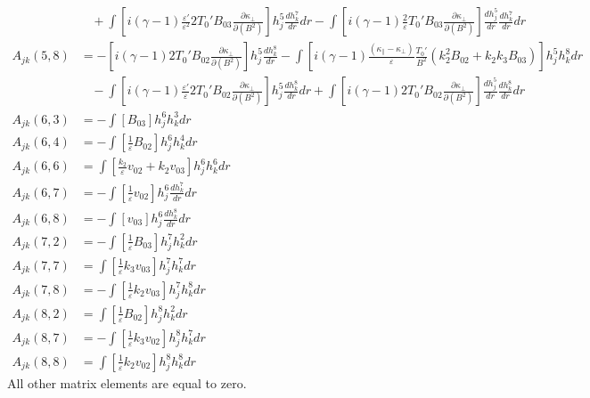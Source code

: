 \documentclass[11pt, fleqn]{article}
\newcommand{\eps}{\varepsilon}
\begin{document}
\begin{align*}
				 &~~~~ + \int \left[i(\gamma - 1)\frac{\eps'}{\eps^2}2T_0'B_{03}\frac{\partial \kappa_\bot}{\partial(B^2)}\right] h_j^5 \frac{dh_k^7}{dr}dr
				 								 - \int \left[i(\gamma - 1)\frac{2}{\eps}T_0'B_{03}\frac{\partial \kappa_\bot}{\partial(B^2)}\right] \frac{dh_j^5}{dr}\frac{dh_k^7}{dr} dr																\\
	A_{jk}(5, 8) &= -\left[i(\gamma - 1)2T_0'B_{02}\frac{\partial \kappa_\bot}{\partial(B^2)}\right] h_j^5 \frac{dh_k^8}{dr} 
												 - \int \left[i(\gamma - 1)\frac{(\kappa_\parallel - \kappa_\bot)}{\eps}\frac{T_0'}{B^2}(k_2^2B_{02} + k_2k_3B_{03})\right] h_j^5 h_k^8 dr	 															\\
				 &~~~~ - \int \left[i(\gamma - 1)\frac{\eps'}{\eps}2T_0'B_{02}\frac{\partial \kappa_\bot}{\partial(B^2)}\right] h_j^5 \frac{dh_k^8}{dr} dr																								
				 								 + \int \left[i(\gamma - 1)2T_0'B_{02}\frac{\partial \kappa_\bot}{\partial(B^2)}\right] \frac{dh_j^5}{dr} \frac{dh_k^8}{dr} dr																			\\
	A_{jk}(6, 3) &= -\int \left[B_{03}\right] h_j^6 h_k^3 dr								\\
	A_{jk}(6, 4) &= -\int \left[\frac{1}{\eps}B_{02}\right] h_j^6 h_k^4 dr					\\
	A_{jk}(6, 6) &=  \int \left[\frac{k_2}{\eps}v_{02} + k_2v_{03}\right] h_j^6 h_k^6 dr	\\
	A_{jk}(6, 7) &= -\int \left[\frac{1}{\eps}v_{02}\right] h_j^6 \frac{dh_k^7}{dr} dr		\\
	A_{jk}(6, 8) &= -\int \left[v_{03}\right] h_j^6 \frac{dh_k^8}{dr} dr					\\
	A_{jk}(7, 2) &= -\int \left[\frac{1}{\eps}B_{03}\right] h_j^7 h_k^2 dr					\\
	A_{jk}(7, 7) &=  \int \left[\frac{1}{\eps}k_3v_{03}\right] h_j^7 h_k^7 dr				\\
	A_{jk}(7, 8) &= -\int \left[\frac{1}{\eps}k_2v_{03}\right] h_j^7 h_k^8 dr				\\
	A_{jk}(8, 2) &=  \int \left[\frac{1}{\eps}B_{02}\right] h_j^8 h_k^2 dr					\\
	A_{jk}(8, 7) &= -\int \left[\frac{1}{\eps}k_3v_{02}\right] h_j^8 h_k^7 dr				\\
	A_{jk}(8, 8) &=  \int \left[\frac{1}{\eps}k_2v_{02}\right] h_j^8 h_k^8 dr				
\end{align*}
All other matrix elements are equal to zero.
\endgroup
\end{document}
